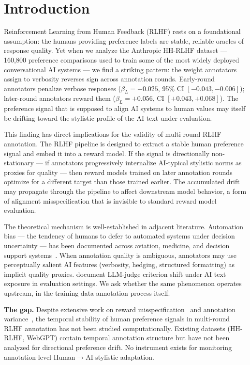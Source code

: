 \section{Introduction}

Reinforcement Learning from Human Feedback (RLHF) rests on a foundational assumption: the humans providing preference labels are stable, reliable oracles of response quality. Yet when we analyze the Anthropic HH-RLHF dataset --- 160,800 preference comparisons used to train some of the most widely deployed conversational AI systems --- we find a striking pattern: the weight annotators assign to verbosity reverses sign across annotation rounds. Early-round annotators penalize verbose responses ($\beta_L = -0.025$, 95\% CI $[-0.043, -0.006]$); later-round annotators reward them ($\beta_L = +0.056$, CI $[+0.043, +0.068]$). The preference signal that is supposed to align AI systems to human values may itself be drifting toward the stylistic profile of the AI text under evaluation.

This finding has direct implications for the validity of multi-round RLHF annotation. The RLHF pipeline is designed to extract a stable human preference signal and embed it into a reward model. If the signal is directionally non-stationary --- if annotators progressively internalize AI-typical stylistic norms as proxies for quality --- then reward models trained on later annotation rounds optimize for a different target than those trained earlier. The accumulated drift may propagate through the pipeline to affect downstream model behavior, a form of alignment misspecification that is invisible to standard reward model evaluation.

The theoretical mechanism is well-established in adjacent literature. Automation bias --- the tendency of humans to defer to automated systems under decision uncertainty --- has been documented across aviation, medicine, and decision support systems~\citep{Skitka1999Accountability}. When annotation quality is ambiguous, annotators may use perceptually salient AI features (verbosity, hedging, structured formatting) as implicit quality proxies. \citet{Thakur2024Judging} document LLM-judge criterion shift under AI text exposure in evaluation settings. We ask whether the same phenomenon operates upstream, in the training data annotation process itself.

\textbf{The gap.} Despite extensive work on reward misspecification~\citep{Pan2022Effects} and annotation variance~\citep{Coste2023Reward}, the temporal stability of human preference signals in multi-round RLHF annotation has not been studied computationally. Existing datasets (HH-RLHF, WebGPT) contain temporal annotation structure but have not been analyzed for directional preference drift. No instrument exists for monitoring annotation-level Human$\to$AI stylistic adaptation.

